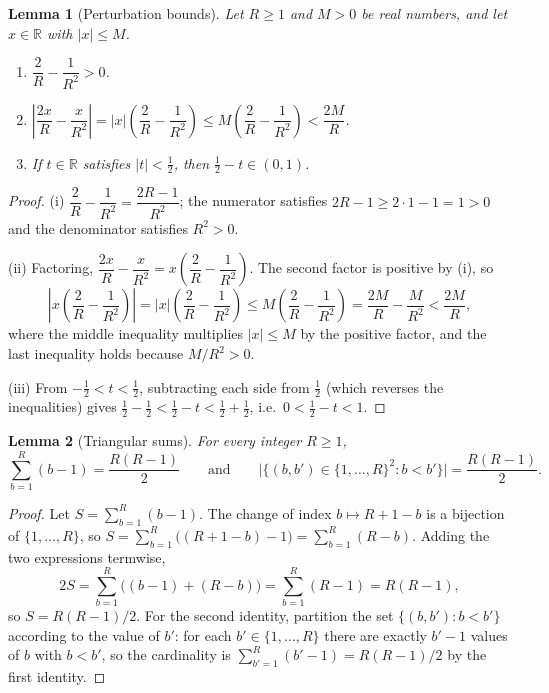 \documentclass[11pt]{article}
\newtheorem{alemma}{Lemma}[section] %
\begin{document}
\begin{alemma}[Perturbation bounds]\label{alem:perturb}
Let $R\ge 1$ and $M>0$ be real numbers, and let $x\in\mathbb{R}$ with $|x|\le M$.
\begin{enumerate}[label=(\roman*)]
\item $\dfrac2R-\dfrac1{R^2}>0$.
\item $\left|\dfrac{2x}{R}-\dfrac{x}{R^2}\right|
  =|x|\left(\dfrac2R-\dfrac1{R^2}\right)
  \le M\left(\dfrac2R-\dfrac1{R^2}\right)
  <\dfrac{2M}{R}$.
\item If $t\in\mathbb{R}$ satisfies $|t|<\tfrac12$, then $\tfrac12-t\in(0,1)$.
\end{enumerate}
\end{alemma}

\begin{proof}
(i) $\dfrac2R-\dfrac1{R^2}=\dfrac{2R-1}{R^2}$; the numerator satisfies $2R-1\ge 2\cdot 1-1=1>0$ and the denominator satisfies $R^2>0$.

(ii) Factoring, $\dfrac{2x}{R}-\dfrac{x}{R^2}=x\left(\dfrac2R-\dfrac1{R^2}\right)$.  The second factor is positive by (i), so
\begin{equation}
  \left|x\left(\frac2R-\frac1{R^2}\right)\right|
  =|x|\left(\frac2R-\frac1{R^2}\right)
  \le M\left(\frac2R-\frac1{R^2}\right)
  =\frac{2M}{R}-\frac{M}{R^2}
  <\frac{2M}{R},
\end{equation}
where the middle inequality multiplies $|x|\le M$ by the positive factor, and the last inequality holds because $M/R^2>0$.

(iii) From $-\tfrac12<t<\tfrac12$, subtracting each side from $\tfrac12$ (which reverses the inequalities) gives $\tfrac12-\tfrac12<\tfrac12-t<\tfrac12+\tfrac12$, i.e.\ $0<\tfrac12-t<1$.
\end{proof}

\begin{alemma}[Triangular sums]\label{alem:triangular}
For every integer $R\ge 1$,
\begin{equation}
  \sum_{b=1}^R (b-1)=\frac{R(R-1)}{2}
  \qquad\text{and}\qquad
  \bigl|\{(b,b')\in\{1,\ldots,R\}^2 : b<b'\}\bigr|=\frac{R(R-1)}{2}.
\end{equation}
\end{alemma}

\begin{proof}
Let $S=\sum_{b=1}^R(b-1)$.  The change of index $b\mapsto R+1-b$ is a bijection of $\{1,\ldots,R\}$, so $S=\sum_{b=1}^R\bigl((R+1-b)-1\bigr)=\sum_{b=1}^R(R-b)$.  Adding the two expressions termwise,
\begin{equation}
  2S=\sum_{b=1}^R\bigl((b-1)+(R-b)\bigr)=\sum_{b=1}^R(R-1)=R(R-1),
\end{equation}
so $S=R(R-1)/2$.  For the second identity, partition the set $\{(b,b'):b<b'\}$ according to the value of $b'$: for each $b'\in\{1,\ldots,R\}$ there are exactly $b'-1$ values of $b$ with $b<b'$, so the cardinality is $\sum_{b'=1}^R(b'-1)=R(R-1)/2$ by the first identity.
\end{proof}
\end{document}
